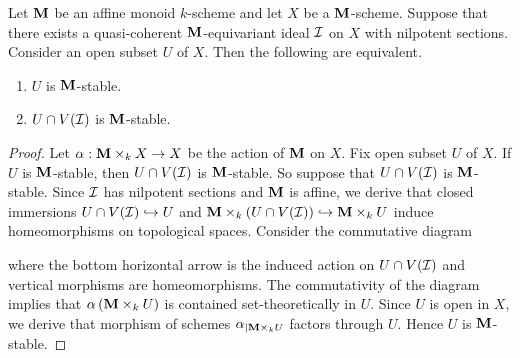\begin{proposition}\label{proposition:monoid_open_stable_correspondence}
Let $\mathbf{M}$ be an affine monoid $k$-scheme and let $X$ be a $\mathbf{M}$-scheme. Suppose that there exists a quasi-coherent $\mathbf{M}$-equivariant ideal ${\mathcal I}$ on $X$ with nilpotent sections. Consider an open subset $U$ of $X$. Then the following are equivalent.
\begin{enumerate}[label=\emph{\textbf{(\arabic*)}}, leftmargin=3.0em]
\item $U$ is $\mathbf{M}$-stable.
\item $U\cap V({\mathcal I})$ is $\mathbf{M}$-stable.
\end{enumerate}
\end{proposition}
\begin{proof}
Let $\alpha:\mathbf{M} \times_k X\rightarrow X$ be the action of $\mathbf{M}$ on $X$. Fix open subset $U$ of $X$. If $U$ is $\mathbf{M}$-stable, then $U\cap V({\mathcal I})$ is $\mathbf{M}$-stable. So suppose that $U\cap V({\mathcal I})$ is $\mathbf{M}$-stable. Since ${\mathcal I}$ has nilpotent sections and $\mathbf{M}$ is affine, we derive that closed immersions $U\cap V({\mathcal I})\hookrightarrow U$ and $\mathbf{M}\times_k \left(U\cap V({\mathcal I})\right) \hookrightarrow \mathbf{M}\times_k U$ induce homeomorphisms on topological spaces. Consider the commutative diagram
\begin{center}
\end{center}
where the bottom horizontal arrow is the induced action on $U\cap V({\mathcal I})$ and vertical morphisms are homeomorphisms. The commutativity of the diagram implies that $\alpha\left(\mathbf{M}\times_k U\right)$ is contained set-theoretically in $U$. Since $U$ is open in $X$, we derive that morphism of schemes $\alpha_{\mid \mathbf{M}\times_k U}$ factors through $U$. Hence $U$ is $\mathbf{M}$-stable.
\end{proof}

